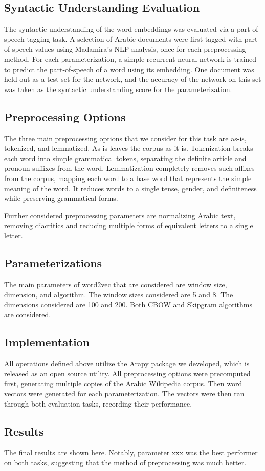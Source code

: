 \subsection{Syntactic Understanding Evaluation}

The syntactic understanding of the word embeddings was evaluated via a part-of-speech tagging task. A selection of Arabic documents were first tagged with part-of-speech values using Madamira's NLP analysis, once for each preprocessing method. For each parameterization, a simple recurrent neural network is trained to predict the part-of-speech of a word using its embedding. One document was held out as a test set for the network, and the accuracy of the network on this set was taken as the syntactic understanding score for the parameterization.

\subsection{Preprocessing Options}

The three main preprocessing options that we consider for this task are as-is, tokenized, and lemmatized. As-is leaves the corpus as it is. Tokenization breaks each word into simple grammatical tokens, separating the definite article and pronoun suffixes from the word. Lemmatization completely removes such affixes from the corpus, mapping each word to a base word that represents the simple meaning of the word. It reduces words to a single tense, gender, and definiteness while preserving grammatical forms.

Further considered preprocessing parameters are normalizing Arabic text, removing diacritics and reducing multiple forms of equivalent letters to a single letter.

\subsection{Parameterizations}

The main parameters of word2vec that are considered are window size, dimension, and algorithm. The window sizes considered are 5 and 8. The dimensions considered are 100 and 200. Both CBOW and Skipgram algorithms are considered.

\subsection{Implementation}

All operations defined above utilize the Arapy package we developed, which is released as an open source utility. All preprocessing options were precomputed first, generating multiple copies of the Arabic Wikipedia corpus. Then word vectors were generated for each parameterization. The vectors were then ran through both evaluation tasks, recording their performance.

\subsection{Results}

The final results are shown here. Notably, parameter xxx was the best performer on both tasks, suggesting that the method of preprocessing was much better.

\label{sec:experiments}
